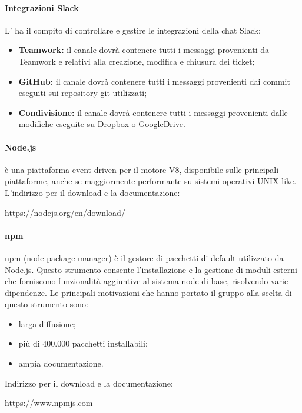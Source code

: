 	\paragraph{Integrazioni Slack} \label{sec:intSlack}
	L'\amministratore{} ha il compito di controllare e gestire le integrazioni della chat Slack:
	\begin{itemize}
		\item \textbf{Teamwork:} il canale  dovrà contenere tutti i messaggi provenienti da Teamwork e relativi alla creazione, modifica e chiusura dei ticket;
		\item \textbf{GitHub:} il canale  dovrà contenere tutti i messaggi provenienti dai commit eseguiti sui repository git utilizzati;
		\item \textbf{Condivisione:} il canale  dovrà contenere tutti i messaggi provenienti dalle modifiche eseguite su Dropbox o GoogleDrive.
	\end{itemize}
	\paragraph{Node.js} \label{nodejs}
	 è una piattaforma event-driven per il motore  V8, disponibile sulle principali piattaforme, anche se maggiormente performante su sistemi operativi UNIX-like.
	L'indirizzo per il download e la documentazione:
	\begin{center}
		\url{https://nodejs.org/en/download/}
	\end{center}
	\paragraph{npm}
	npm (node package manager) è il gestore di pacchetti di default utilizzato da Node.js. Questo strumento consente  l'installazione e la gestione di moduli esterni che forniscono funzionalità aggiuntive al sistema node di base, risolvendo varie dipendenze.
	Le principali motivazioni che hanno portato il gruppo alla scelta di questo strumento sono:
	\begin{itemize}
		\item larga diffusione;
		\item più di 400.000 pacchetti installabili;
		\item ampia documentazione.
	\end{itemize}
	Indirizzo per il download e la documentazione:
	\begin{center}
		\url{https://www.npmjs.com}
	\end{center}
